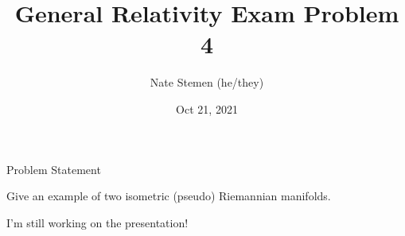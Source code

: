 \documentclass[11pt,aspectratio=1610,xcolor=dvipsnames]{beamer}
\title{General Relativity Exam Problem 4}
\date{Oct 21, 2021}
\author{Nate Stemen (he/they)}
\institute{AMATH 875}
\newcommand{\problemstatement}{Give an example of two isometric (pseudo) Riemannian manifolds.}
\begin{document}
\maketitle

\begin{frame}{Problem Statement}
	\large
	\begin{prob}
		\problemstatement
	\end{prob}
\end{frame}


\begin{frame}
	\Huge
	I'm still working on the presentation!
\end{frame}
\end{document}
